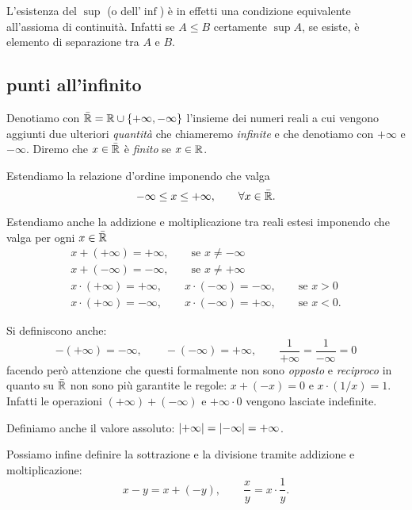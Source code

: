 L'esistenza del $\sup$ (o dell'$\inf$)
è in effetti una condizione equivalente all'assioma di continuità.
Infatti se $A\le B$ certamente $\sup A$, se esiste, è elemento 
di separazione tra $A$ e $B$.

\subsection{punti all'infinito}
\label{sec:reali_estesi}

\begin{definition}
\mymargin{$\bar\RR$}%
\index{$\bar{\RR}$}
Denotiamo con $\bar {{\mathbb R}}={\mathbb R} \cup {\left\{ +\infty, -\infty \right\}}$ l'insieme dei numeri reali
\mymargin{$+\infty$, $-\infty$}%
\index{$+\infty$, $-\infty$}
a cui vengono aggiunti due ulteriori \emph{quantità} che chiameremo
\emph{infinite} e che denotiamo con $+\infty$ e $-\infty$.
Diremo che $x\in \bar {{\mathbb R}}$ è \emph{finito} se $x\in {\mathbb R}$.
\end{definition}


Estendiamo la relazione d'ordine imponendo che valga
\[
  -\infty \le x \le +\infty, \qquad \forall x \in \bar{{\mathbb R}}.
\]

Estendiamo anche la addizione e moltiplicazione
tra reali estesi imponendo che valga per ogni $x\in \bar {{\mathbb R}}$
\begin{gather*}
  x + (+\infty) = +\infty, \qquad \text{se $x\neq -\infty$}\\
  x + (-\infty) = -\infty, \qquad \text{se $x\neq +\infty$}\\
  x \cdot (+\infty) = +\infty, \qquad
  x \cdot (-\infty) = -\infty, \qquad \text{se $x>0$} \\
  x \cdot (+\infty) = -\infty, \qquad
  x \cdot (-\infty) = +\infty, \qquad \text{se $x<0$}.
\end{gather*}

Si definiscono anche:
\[
 -(+\infty) = -\infty, \qquad
 -(-\infty) = +\infty, \qquad
 \frac{1}{+\infty} = \frac{1}{-\infty}=0
\]
facendo però attenzione che
questi formalmente non sono \emph{opposto}
e \emph{reciproco} in quanto
su $\bar \RR$ non sono più garantite
le regole: $x + (-x) = 0$ e $x \cdot (1/x) = 1$.
Infatti
le operazioni $(+\infty) + (-\infty)$ e $+\infty \cdot 0$ vengono
lasciate indefinite.

Definiamo anche il valore assoluto: ${\left|+\infty\right|} = {\left|-\infty\right|} = +\infty$.

Possiamo infine definire la sottrazione e la divisione tramite
addizione e moltiplicazione:
\[
  x - y = x + (-y), \qquad \frac{x}{y} = x \cdot \frac{1}{y}.
\]

